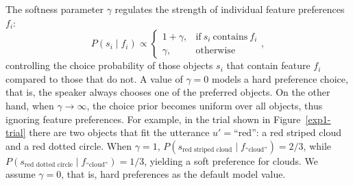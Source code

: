 \documentclass[10pt,a4paper]{article}
\begin{document}
The softness parameter $\gamma$ regulates the strength of individual feature preferences $f_i$:
$$ P(s_i \mid f_i) \propto \begin{cases}
1 + \gamma, & \text{if}\ s_i\ \text{contains}\ f_i \\
\gamma, & \text{otherwise}
\end{cases},$$
controlling the choice probability of those objects $s_i$ that contain feature $f_i$ compared to those that do not.  
A value of $\gamma=0$ models a hard preference choice, that is, the speaker always chooses one of the preferred objects. 
On the other hand, when $\gamma \rightarrow \infty$, the choice prior becomes uniform over all objects, thus ignoring feature preferences. 
 For example, in the trial shown in Figure~\ref{exp1-trial} there are two objects that fit the utterance $u'=\text{``red''}$: a red striped cloud and a red dotted circle.
 When $\gamma=1$, $P(s_{\textrm{red\ striped\ cloud}}\mid f_{\textrm{``cloud''}}) = 2/3$, while
 $P(s_{\textrm{red\ dotted\ circle}}\mid f_{\textrm{``cloud''}})= 1/3$, yielding a soft preference for clouds.
 We assume $\gamma=0$, that is, hard preferences as the default model value.
\end{document}
